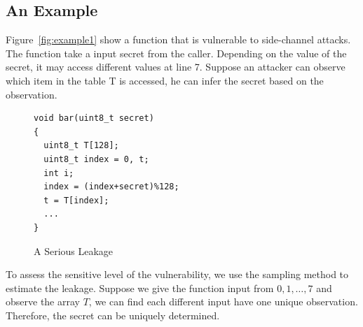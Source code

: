 \subsection{An Example}
Figure~\ref{fig:example1} show a function that is vulnerable to side-channel attacks. The function take a input secret from the caller. Depending on the value of the secret, it may access different values at line 7. Suppose an attacker can observe which item in the table \textsf{T} is accessed, he can infer the secret based on the observation.
\begin{figure}[h]
  \begin{minipage}{0.6\linewidth}
    \begin{lstlisting}[xleftmargin=.15\textwidth,xrightmargin=.30\textwidth]
void bar(uint8_t secret)
{
  uint8_t T[128];
  uint8_t index = 0, t;
  int i;
  index = (index+secret)%128;
  t = T[index];
  ...
}
\end{lstlisting}
  \end{minipage}
  \hfill
  \begin{minipage}{0.4\linewidth}
  \end{minipage}
  \caption{A Serious Leakage}\label{chapter5:fig:example1}
\end{figure}

To assess the sensitive level of the vulnerability, we use the sampling method to estimate the leakage. Suppose we give the function input from $0, 1, \dots, 7$ and observe the array $T$, we can find each different input have one unique observation. Therefore, the secret can be uniquely determined.

